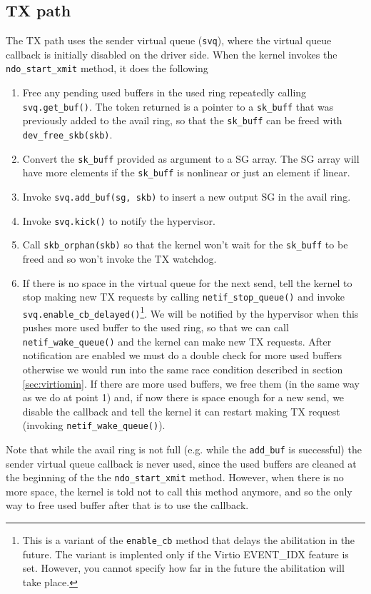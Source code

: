\subsection{TX path}
\label{sec:virtionet-tx}
The TX path uses the sender virtual queue (\texttt{svq}), where the virtual queue callback is initially disabled on the driver side.
When the kernel invokes the \texttt{ndo\_start\_xmit} method, it does the following
\begin{enumerate}
  \item Free any pending used buffers in the used ring repeatedly calling \texttt{svq.get\_buf()}. The token returned is a pointer to a
	\texttt{sk\_buff} that was previously added to the avail ring, so that the \texttt{sk\_buff} can be freed with
	\texttt{dev\_free\_skb(skb)}.
  \item Convert the \texttt{sk\_buff} provided as argument to a SG array. The SG array will have more elements if the
	\texttt{sk\_buff} is nonlinear or just an element if linear.
  \item Invoke \texttt{svq.add\_buf(sg, skb)} to insert a new output SG in the avail ring.
  \item Invoke \texttt{svq.kick()} to notify the hypervisor.
  \item Call \texttt{skb\_orphan(skb)} so that the kernel won't wait for the \texttt{sk\_buff} to be freed and so won't invoke the
	TX watchdog.
  \item If there is no space in the virtual queue for the next send, tell the kernel to stop making new TX requests by calling
	\texttt{netif\_stop\_queue()} and invoke \texttt{svq.enable\_cb\_delayed()}\footnote{This is a variant of the \texttt{enable\_cb}
	method that delays the abilitation in the future. The variant is implented only if the Virtio EVENT\_IDX feature is set. However,
	you cannot specify how far in the future the abilitation will take place.}.
	We will be notified by the hypervisor when this pushes more used buffer to the used ring, so that we can
	call \texttt{netif\_wake\_queue()} and the kernel can make new TX requests.
	After notification are enabled we must do a double check for more used buffers otherwise we would run into the same race condition
	described in section \ref{sec:virtiomin}. If there are more used buffers, we free them (in the same way as we do at point 1) and,
	if now there is space enough for a new send, we disable the callback and tell the kernel it can restart making TX request (invoking
	\texttt{netif\_wake\_queue()}).
\end{enumerate}
Note that while the avail ring is not full (e.g. while the \texttt{add\_buf} is successful) the sender virtual queue callback is never used,
since the used buffers are cleaned at the beginning of the the \texttt{ndo\_start\_xmit} method.
However, when there is no more space, the kernel is told not to call this method anymore, and so the only way to free used buffer after that
is to use the callback.


